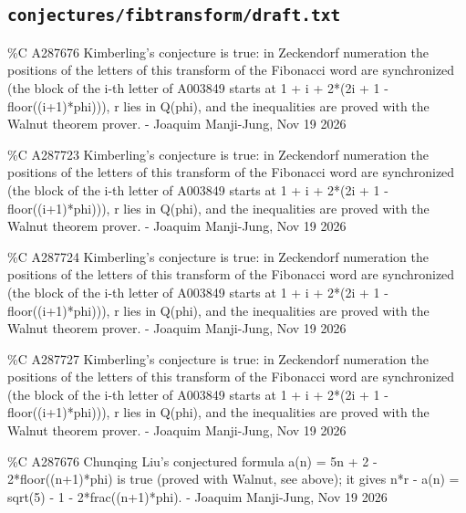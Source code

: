 \subsection*{\texttt{conjectures/fibtransform/draft.txt}}
{\small\raggedright\ttfamily
\%C A287676 Kimberling's conjecture is true: in Zeckendorf numeration the positions of the letters of this transform of the Fibonacci word are synchronized (the block of the i-th letter of A003849 starts at 1 + i + 2*(2i + 1 - floor((i+1)*phi))), r lies in Q(phi), and the inequalities are proved with the Walnut theorem prover. - Joaquim Manji-Jung, Nov 19 2026\par
\%C A287723 Kimberling's conjecture is true: in Zeckendorf numeration the positions of the letters of this transform of the Fibonacci word are synchronized (the block of the i-th letter of A003849 starts at 1 + i + 2*(2i + 1 - floor((i+1)*phi))), r lies in Q(phi), and the inequalities are proved with the Walnut theorem prover. - Joaquim Manji-Jung, Nov 19 2026\par
\%C A287724 Kimberling's conjecture is true: in Zeckendorf numeration the positions of the letters of this transform of the Fibonacci word are synchronized (the block of the i-th letter of A003849 starts at 1 + i + 2*(2i + 1 - floor((i+1)*phi))), r lies in Q(phi), and the inequalities are proved with the Walnut theorem prover. - Joaquim Manji-Jung, Nov 19 2026\par
\%C A287727 Kimberling's conjecture is true: in Zeckendorf numeration the positions of the letters of this transform of the Fibonacci word are synchronized (the block of the i-th letter of A003849 starts at 1 + i + 2*(2i + 1 - floor((i+1)*phi))), r lies in Q(phi), and the inequalities are proved with the Walnut theorem prover. - Joaquim Manji-Jung, Nov 19 2026\par
\%C A287676 Chunqing Liu's conjectured formula a(n) = 5n + 2 - 2*floor((n+1)*phi) is true (proved with Walnut, see above); it gives n*r - a(n) = sqrt(5) - 1 - 2*frac((n+1)*phi). - Joaquim Manji-Jung, Nov 19 2026\par
}
